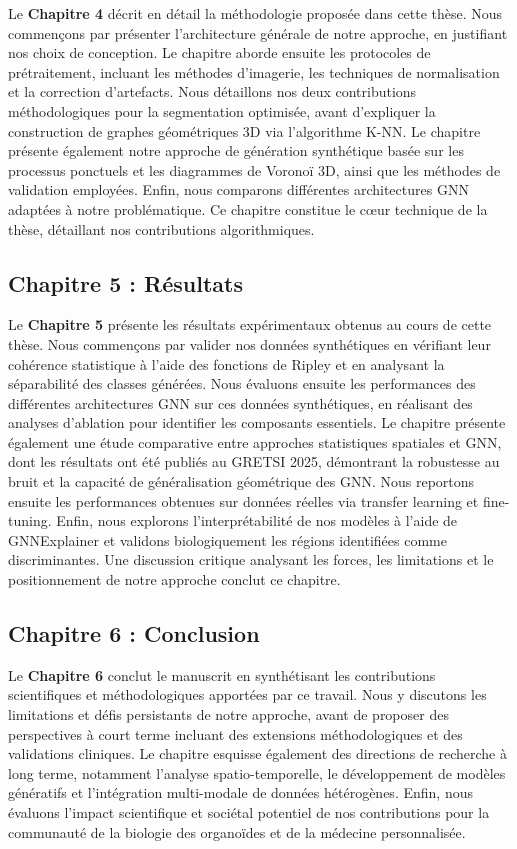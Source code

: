 Le \textbf{Chapitre 4} décrit en détail la méthodologie proposée dans cette thèse. Nous commençons par présenter l'architecture générale de notre approche, en justifiant nos choix de conception. Le chapitre aborde ensuite les protocoles de prétraitement, incluant les méthodes d'imagerie, les techniques de normalisation et la correction d'artefacts. Nous détaillons nos deux contributions méthodologiques pour la segmentation optimisée, avant d'expliquer la construction de graphes géométriques 3D via l'algorithme K-NN. Le chapitre présente également notre approche de génération synthétique basée sur les processus ponctuels et les diagrammes de Voronoï 3D, ainsi que les méthodes de validation employées. Enfin, nous comparons différentes architectures GNN adaptées à notre problématique. Ce chapitre constitue le cœur technique de la thèse, détaillant nos contributions algorithmiques.

\subsection{Chapitre 5 : Résultats}

Le \textbf{Chapitre 5} présente les résultats expérimentaux obtenus au cours de cette thèse. Nous commençons par valider nos données synthétiques en vérifiant leur cohérence statistique à l'aide des fonctions de Ripley et en analysant la séparabilité des classes générées. Nous évaluons ensuite les performances des différentes architectures GNN sur ces données synthétiques, en réalisant des analyses d'ablation pour identifier les composants essentiels. Le chapitre présente également une étude comparative entre approches statistiques spatiales et GNN, dont les résultats ont été publiés au GRETSI 2025, démontrant la robustesse au bruit et la capacité de généralisation géométrique des GNN. Nous reportons ensuite les performances obtenues sur données réelles via transfer learning et fine-tuning. Enfin, nous explorons l'interprétabilité de nos modèles à l'aide de GNNExplainer et validons biologiquement les régions identifiées comme discriminantes. Une discussion critique analysant les forces, les limitations et le positionnement de notre approche conclut ce chapitre.

\subsection{Chapitre 6 : Conclusion}

Le \textbf{Chapitre 6} conclut le manuscrit en synthétisant les contributions scientifiques et méthodologiques apportées par ce travail. Nous y discutons les limitations et défis persistants de notre approche, avant de proposer des perspectives à court terme incluant des extensions méthodologiques et des validations cliniques. Le chapitre esquisse également des directions de recherche à long terme, notamment l'analyse spatio-temporelle, le développement de modèles génératifs et l'intégration multi-modale de données hétérogènes. Enfin, nous évaluons l'impact scientifique et sociétal potentiel de nos contributions pour la communauté de la biologie des organoïdes et de la médecine personnalisée.

